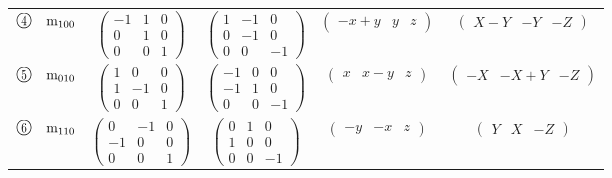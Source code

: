 \documentclass[fleqn,10pt,landscape]{jsarticle}
\begin{document}
\begin{center}
\begin{longtable}{lcccc}
$ {\ooalign{\hfil\resizebox{.8\width}{\height}{4}\hfil\crcr\raise.1ex\hbox{\large$\bigcirc$}}}\quad {\rm m}_{100} $ & $ \begin{pmatrix} -1 & 1 & 0 \\ 0 & 1 & 0 \\ 0 & 0 & 1 \end{pmatrix} $ & $ \begin{pmatrix} 1 & -1 & 0 \\ 0 & -1 & 0 \\ 0 & 0 & -1 \end{pmatrix} $ & $ \begin{pmatrix} - x + y & y & z \end{pmatrix} $ & $ \begin{pmatrix} X - Y & - Y & - Z \end{pmatrix} $ \\
$ {\ooalign{\hfil\resizebox{.8\width}{\height}{5}\hfil\crcr\raise.1ex\hbox{\large$\bigcirc$}}}\quad {\rm m}_{010} $ & $ \begin{pmatrix} 1 & 0 & 0 \\ 1 & -1 & 0 \\ 0 & 0 & 1 \end{pmatrix} $ & $ \begin{pmatrix} -1 & 0 & 0 \\ -1 & 1 & 0 \\ 0 & 0 & -1 \end{pmatrix} $ & $ \begin{pmatrix} x & x - y & z \end{pmatrix} $ & $ \begin{pmatrix} - X & - X + Y & - Z \end{pmatrix} $ \\
$ {\ooalign{\hfil\resizebox{.8\width}{\height}{6}\hfil\crcr\raise.1ex\hbox{\large$\bigcirc$}}}\quad {\rm m}_{110} $ & $ \begin{pmatrix} 0 & -1 & 0 \\ -1 & 0 & 0 \\ 0 & 0 & 1 \end{pmatrix} $ & $ \begin{pmatrix} 0 & 1 & 0 \\ 1 & 0 & 0 \\ 0 & 0 & -1 \end{pmatrix} $ & $ \begin{pmatrix} - y & - x & z \end{pmatrix} $ & $ \begin{pmatrix} Y & X & - Z \end{pmatrix} $ \\
\end{longtable}
\end{center}
\end{document}
